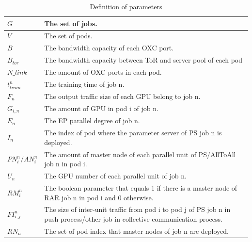 \documentclass[conference]{IEEEtran}
\begin{document}
\begin{table}[]
	\caption{Definition of parameters}
	\label{tbl_1}
	\begin{tabular}{p{1.5cm}<{\centering}p{6.5cm}}
		\toprule
		$G$ & The set of jobs. \\
		\midrule
		$V$ & The set of pods.\\
		\midrule
		$B$ & The bandwidth capacity of each OXC port.\\
		\midrule
		$B_{tor}$ & The bandwidth capacity between ToR and server pool of each pod\\
		\midrule
		$N\_link$ & The amount of OXC ports in each pod.\\
		\midrule
		$t_{train}^n$ & The training time of job n.\\
		\midrule
		$F_n$ & The output traffic size of each GPU belong to job n.\\
		\midrule
		$G_{i,n}$ & The amount of GPU in pod i of job n.\\
		\midrule
		$E_n$ & The EP parallel degree of job n.\\
		\midrule
		$I_n$ & The index of pod where the parameter server of PS job n is deployed.\\
		\midrule
		$PN_i^n/AN_i^n$ & The amount of master node of each parallel unit of PS/AllToAll job n in pod i.\\
		\midrule
		$U_n$ & The GPU number of each parallel unit of job n.\\
		\midrule
		$RM_i^n$ & The boolean parameter that equals 1 if there is a master node of RAR job n in pod i and 0 otherwise.\\
		\midrule
		$FI_{i,j}^{n}$ & The size of inter-unit traffic from pod i to pod j of PS job n in push process/other job in collective communication process.\\
		\midrule
		$RN_n$ & The set of pod index that master nodes of job n are deployed.\\
		\bottomrule
	\end{tabular}
\end{table}
\end{document}
